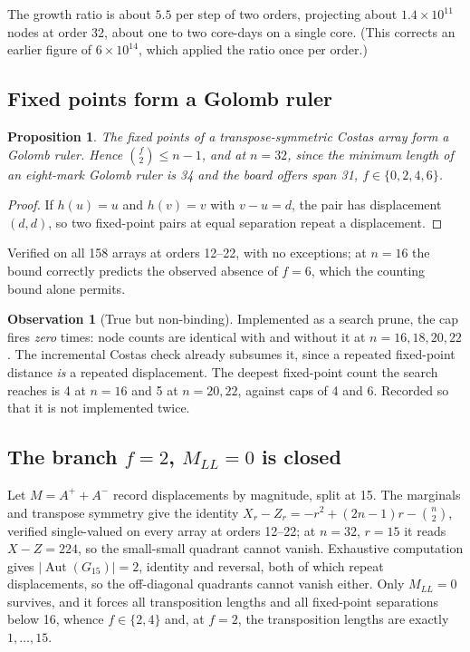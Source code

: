 \documentclass[11pt,a4paper]{article}
\newtheorem{proposition}[theorem]{Proposition}
\theoremstyle{definition}
\newtheorem{observation}[theorem]{Observation}
\begin{document}
\noindent The growth ratio is about $5.5$ per step of two orders, projecting about
$1.4\times10^{11}$ nodes at order 32, about one to two core-days on a single core. (This
corrects an earlier figure of $6\times10^{14}$, which applied the ratio once per order.)

\subsection{Fixed points form a Golomb ruler}

\begin{proposition}
\label{prop:fpgolomb}
The fixed points of a transpose-symmetric Costas array form a Golomb ruler.
Hence $\binom f2\le n-1$, and at $n=32$, since the minimum length of an
eight-mark Golomb ruler is 34 and the board offers span 31, $f\in\{0,2,4,6\}$.
\end{proposition}
\begin{proof}
If $h(u)=u$ and $h(v)=v$ with $v-u=d$, the pair has displacement $(d,d)$, so two
fixed-point pairs at equal separation repeat a displacement.
\end{proof}

Verified on all 158 arrays at orders 12--22, with no exceptions; at $n=16$ the
bound correctly predicts the observed absence of $f=6$, which the counting bound
alone permits.

\begin{observation}[True but non-binding]
\label{obs:fpnonbinding}
Implemented as a search prune, the cap fires \emph{zero} times: node counts are
identical with and without it at $n=16,18,20,22$. The incremental Costas check
already subsumes it, since a repeated fixed-point distance \emph{is} a repeated
displacement. The deepest fixed-point count the search reaches is 4 at $n=16$
and 5 at $n=20,22$, against caps of 4 and 6. Recorded so that it is not
implemented twice.
\end{observation}

\subsection{The branch $f=2$, $M_{LL}=0$ is closed}

Let $M=A^++A^-$ record displacements by magnitude, split at 15. The marginals and
transpose symmetry give the identity $X_r-Z_r=-r^2+(2n-1)r-\binom n2$, verified
single-valued on every array at orders 12--22; at $n=32$, $r=15$ it reads
$X-Z=224$, so the small-small quadrant cannot vanish. Exhaustive computation
gives $|\operatorname{Aut}(G_{15})|=2$, identity and reversal, both of which
repeat displacements, so the off-diagonal quadrants cannot vanish either. Only
$M_{LL}=0$ survives, and it forces all transposition lengths and all
fixed-point separations below 16, whence $f\in\{2,4\}$ and, at $f=2$, the
transposition lengths are exactly $1,\dots,15$.
\end{document}
